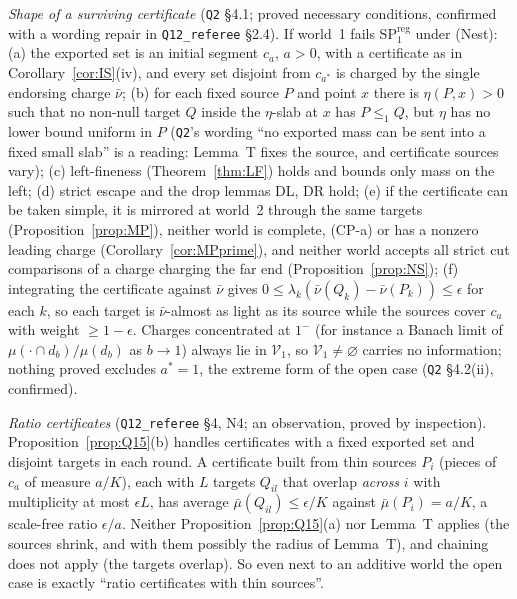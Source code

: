 \documentclass[11pt]{article}
\theoremstyle{definition}
\theoremstyle{remark}
\newcommand{\src}[1]{\texttt{#1}}
\begin{document}
\emph{Shape of a surviving certificate} (\src{Q2} \S4.1; proved necessary conditions, confirmed with a wording repair in \src{Q12\_referee} \S2.4). If world~1 fails SP$^{\mathrm{reg}}_1$ under (Nest): (a) the exported set is an initial segment $c_a$, $a>0$, with a certificate as in Corollary~\ref{cor:IS}(iv), and every set disjoint from $c_{a^*}$ is charged by the single endorsing charge $\bar\nu$; (b) for each fixed source $P$ and point $x$ there is $\eta(P,x)>0$ such that no non-null target $Q$ inside the $\eta$-slab at $x$ has $P\le_1Q$, but $\eta$ has no lower bound uniform in $P$ (\src{Q2}'s wording ``no exported mass can be sent into a fixed small slab'' is a reading: Lemma~T fixes the source, and certificate sources vary); (c) left-fineness (Theorem~\ref{thm:LF}) holds and bounds only mass on the left; (d) strict escape and the drop lemmas DL, DR hold; (e) if the certificate can be taken simple, it is mirrored at world~2 through the same targets (Proposition~\ref{prop:MP}), neither world is complete, (CP-a) or has a nonzero leading charge (Corollary~\ref{cor:MPprime}), and neither world accepts all strict cut comparisons of a charge charging the far end (Proposition~\ref{prop:NS}); (f) integrating the certificate against $\bar\nu$ gives $0\le\lambda_k(\bar\nu(Q_k)-\bar\nu(P_k))\le\epsilon$ for each $k$, so each target is $\bar\nu$-almost as light as its source while the sources cover $c_a$ with weight $\ge1-\epsilon$. Charges concentrated at $1^-$ (for instance a Banach limit of $\mu(\cdot\cap d_b)/\mu(d_b)$ as $b\to1$) always lie in $\mathcal V_1$, so $\mathcal V_1\ne\varnothing$ carries no information; nothing proved excludes $a^*=1$, the extreme form of the open case (\src{Q2} \S4.2(ii), confirmed).

\emph{Ratio certificates} (\src{Q12\_referee} \S4, N4; an observation, proved by inspection). Proposition~\ref{prop:Q15}(b) handles certificates with a fixed exported set and disjoint targets in each round. A certificate built from thin sources $P_i$ (pieces of $c_a$ of measure $a/K$), each with $L$ targets $Q_{il}$ that overlap \emph{across} $i$ with multiplicity at most $\epsilon L$, has average $\bar\mu(Q_{il})\le\epsilon/K$ against $\bar\mu(P_i)=a/K$, a scale-free ratio $\epsilon/a$. Neither Proposition~\ref{prop:Q15}(a) nor Lemma~T applies (the sources shrink, and with them possibly the radius of Lemma~T), and chaining does not apply (the targets overlap). So even next to an additive world the open case is exactly ``ratio certificates with thin sources''.
\end{document}

